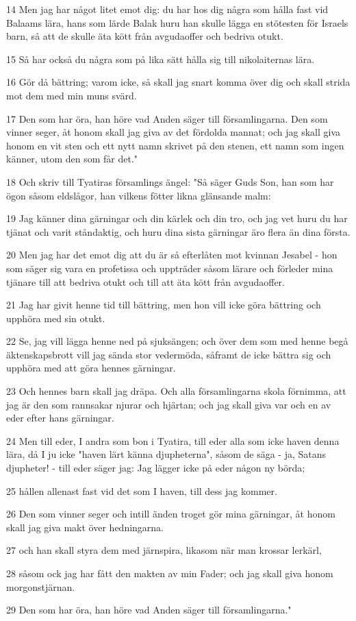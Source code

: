 \par 14 Men jag har något litet emot dig: du har hos dig några som hålla fast vid Balaams lära, hans som lärde Balak huru han skulle lägga en stötesten för Israels barn, så att de skulle äta kött från avgudaoffer och bedriva otukt.
\par 15 Så har också du några som på lika sätt hålla sig till nikolaiternas lära.
\par 16 Gör då bättring; varom icke, så skall jag snart komma över dig och skall strida mot dem med min muns svärd.
\par 17 Den som har öra, han höre vad Anden säger till församlingarna. Den som vinner seger, åt honom skall jag giva av det fördolda mannat; och jag skall giva honom en vit sten och ett nytt namn skrivet på den stenen, ett namn som ingen känner, utom den som får det."
\par 18 Och skriv till Tyatiras församlings ängel: "Så säger Guds Son, han som har ögon såsom eldslågor, han vilkens fötter likna glänsande malm:
\par 19 Jag känner dina gärningar och din kärlek och din tro, och jag vet huru du har tjänat och varit ståndaktig, och huru dina sista gärningar äro flera än dina första.
\par 20 Men jag har det emot dig att du är så efterlåten mot kvinnan Jesabel - hon som säger sig vara en profetissa och uppträder såsom lärare och förleder mina tjänare till att bedriva otukt och till att äta kött från avgudaoffer.
\par 21 Jag har givit henne tid till bättring, men hon vill icke göra bättring och upphöra med sin otukt.
\par 22 Se, jag vill lägga henne ned på sjuksängen; och över dem som med henne begå äktenskapsbrott vill jag sända stor vedermöda, såframt de icke bättra sig och upphöra med att göra hennes gärningar.
\par 23 Och hennes barn skall jag dräpa. Och alla församlingarna skola förnimma, att jag är den som rannsakar njurar och hjärtan; och jag skall giva var och en av eder efter hans gärningar.
\par 24 Men till eder, I andra som bon i Tyatira, till eder alla som icke haven denna lära, då I ju icke "haven lärt känna djupheterna", såsom de säga - ja, Satans djupheter! - till eder säger jag: Jag lägger icke på eder någon ny börda;
\par 25 hållen allenast fast vid det som I haven, till dess jag kommer.
\par 26 Den som vinner seger och intill änden troget gör mina gärningar, åt honom skall jag giva makt över hedningarna.
\par 27 och han skall styra dem med järnspira, likasom när man krossar lerkärl,
\par 28 såsom ock jag har fått den makten av min Fader; och jag skall giva honom morgonstjärnan.
\par 29 Den som har öra, han höre vad Anden säger till församlingarna."

